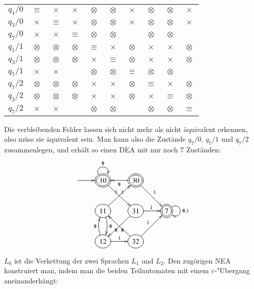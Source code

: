 \begin{loesung}
\begin{teilaufgaben}
\begin{center}
\begin{tabular}{|c|ccccccccc|}
\hline
$q_1/0$  &$\equiv$ &$\times $&$\times $&$\otimes$&$\otimes$&$\times $&$\otimes$&$\otimes$&$\times $\\
$q_3/0$  &$\times $&$\equiv$ &$\times $&$\otimes$&$\otimes$&$\times $&$\otimes$&$\otimes$&$\times $\\
$q_7/0$  &$\times $&$\times $&$\equiv$ &$\otimes$&$\otimes$&$       $&$\otimes$&$\otimes$&$       $\\
$q_1/1$  &$\otimes$&$\otimes$&$\otimes$&$\equiv$ &$\times $&$\otimes$&$\times $&$\times $&$\otimes$\\
$q_3/1$  &$\otimes$&$\otimes$&$\otimes$&$\times $&$\equiv$ &$\otimes$&$\times $&$\times $&$\otimes$\\
$q_7/1$  &$\times $&$\times $&$       $&$\otimes$&$\otimes$&$\equiv$ &$\otimes$&$\otimes$&$       $\\
$q_1/2$  &$\otimes$&$\otimes$&$\otimes$&$\times $&$\times $&$\otimes$&$\equiv$ &$\times $&$\otimes$\\
$q_3/2$  &$\otimes$&$\otimes$&$\otimes$&$\times $&$\times $&$\otimes$&$\times $&$\equiv$ &$\otimes$\\
$q_7/2$  &$\times $&$\times $&$       $&$\otimes$&$\otimes$&$       $&$\otimes$&$\otimes$&$\equiv$ \\
\hline
\end{tabular}
\end{center}
Die verbleibenden Felder lassen sich nicht mehr als nicht äquivalent
erkennen, also müss sie äquivalent sein. Man kann also die Zustände
$q_7/0$, $q_7/1$ und $q_7/2$ zusammenlegen, und erhält so einen DEA
mit nur noch 7 Zuständen:
\[
\entrymodifiers={++[o][F]}
\xymatrix{
*+\txt{}\ar[r]
        &*++[o][F=]{10}\ar@(ul,ur)^{\tt 0} \ar[dr]^{\tt 1}
                &*++[o][F=]{30} \ar[l]^{\tt 0} \ar[dr]^{\tt 1}
\\
*+\txt{}
        &{11} \ar[ur]^{\tt 1} \ar@/^/[d]^{\tt 0}
                &{31} \ar[r]^{\tt 1} \ar[dl]^{\tt 0}
                        &*++[o][F=]{7}\ar@(ur,dr)^{{\tt 0},{\tt 1}}
\\
*+\txt{}
        &{12} \ar@/^/[u]^{\tt 0} \ar[r]^{\tt 1}
                &{32} \ar[ur]^{\tt 1} \ar[ul]^{\tt 0}
}
\]
\item $L_6$ ist die Verkettung der zwei Sprachen $L_1$ und $L_2$.
Den zugörigen NEA konstruiert man, indem man die beiden Teilautomaten
mit einem $\varepsilon$-"Ubergang aneinanderhängt:
\begin{center}
\end{center}
\end{teilaufgaben}
\end{loesung}
